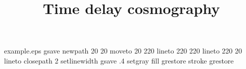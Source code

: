 %
\begin{filecontents*}{example.eps}
gsave
newpath
  20 20 moveto
  20 220 lineto
  220 220 lineto
  220 20 lineto
closepath
2 setlinewidth
gsave
  .4 setgray fill
grestore
stroke
grestore
\end{filecontents*}
%
\RequirePackage{fix-cm}
%
\documentclass[smallextended]{svjour3}       %
%
\smartqed  %
%
%
%
\usepackage{graphicx}
\usepackage[round]{natbib}
\usepackage{amssymb,amsmath}
%
\newcommand{\mnras}{MNRAS}
\newcommand{\nat}{Nature}
\newcommand{\aap}{A\&A}
\newcommand{\apj}{ApJ}
\newcommand{\apjl}{ApJL}
\newcommand{\apjs}{ApJS}
\newcommand{\jcap}{JCAP}
\newcommand{\physrep}{Phys.Rep.}
\newcommand{\prd}{Phys.Rev.D}
\newcommand{\araa}{ARA\&A}
\newcommand{\Ddt}{D_{\Delta{\rm t}}}
\newcommand{\Dd}{D_{\rm d}}
\newcommand{\Ds}{D_{\rm s}}
\newcommand{\Dds}{D_{\rm ds}}
\newcommand{\zd}{z_{\rm d}}
\newcommand{\zs}{z_{\rm s}}
\newcommand{\cospars}{\boldsymbol{\Omega}}
\newcommand{\Ok}{\Omega_{\rm k}}
\newcommand{\ODE}{\Omega_{\rm DE}}
\newcommand{\wDE}{w_0}
\newcommand{\x}{\boldsymbol{\theta}}
\newcommand{\y}{\boldsymbol{\beta}}
\newcommand{\grad}{\boldsymbol{\nabla}}
\newcommand{\deflectionangle}{\boldsymbol{\alpha}}
%
%



\title{Time delay cosmography%
}


